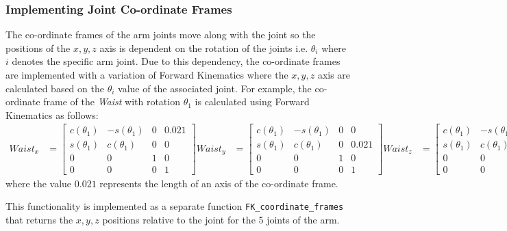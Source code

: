\documentclass[9pt, a4paper]{article}
\begin{document}
\subsubsection{Implementing Joint Co-ordinate Frames}
The co-ordinate frames of the arm joints move along with the joint so the
positions of the $x,y,z$ axis is dependent on the rotation of the joints i.e. $\theta_i$
where $i$ denotes the specific arm joint. Due to this dependency, the
co-ordinate frames are implemented with a variation of Forward Kinematics where
the $x,y,z$ axis are calculated based on the $\theta_i$ value of the associated
joint. For example, the co-ordinate frame of the \textit{Waist} with rotation $\theta_1$ is calculated
using Forward Kinematics as follows:
{\small
\begin{align*}
  Waist_x &= \begin{bmatrix}
    c(\theta_1) & -s(\theta_1) & 0 & 0.021 \\ 
    s(\theta_1) & c(\theta_1)  & 0 & 0     \\ 
    0 & 0 & 1 & 0 \\ 
    0 & 0 & 0 & 1
  \end{bmatrix} 
  Waist_y &= \begin{bmatrix}
    c(\theta_1) & -s(\theta_1) & 0 & 0 \\ 
    s(\theta_1) & c(\theta_1)  & 0 & 0.021 \\ 
    0 & 0 & 1 & 0 \\ 
    0 & 0 & 0 & 1
  \end{bmatrix} 
  Waist_z &= \begin{bmatrix}
    c(\theta_1) & -s(\theta_1) & 0 & 0 \\ 
    s(\theta_1) & c(\theta_1)  & 0 & 0 \\ 
    0 & 0 & 1 & 0.021 \\ 
    0 & 0 & 0 & 1
  \end{bmatrix} 
\end{align*}
}%
where the value $0.021$ represents the length of an axis of the co-ordinate
frame.

This functionality is implemented as a separate function
\verb+FK_coordinate_frames+ that returns the
$x,y,z$ positions relative to the joint for the 5 joints of the arm.

\pagebreak
\end{document}
